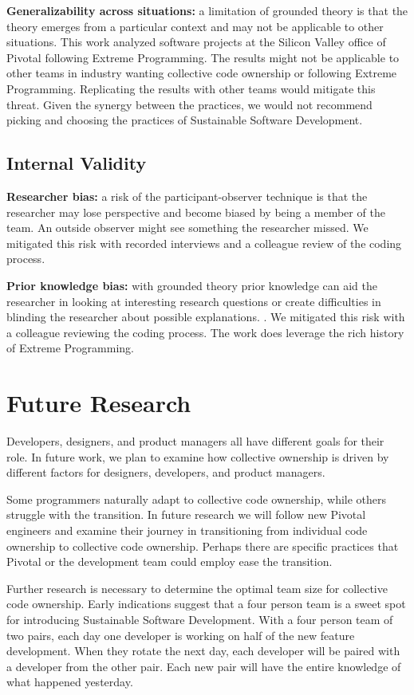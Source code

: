 \begin{table}[]
\textbf{Generalizability across situations:} a limitation of grounded theory is that the theory emerges from a particular context and may not be applicable to other situations. This work analyzed software projects at the Silicon Valley office of Pivotal following Extreme Programming. The results might not be applicable to other teams in industry wanting collective code ownership or  following Extreme Programming. Replicating the results with other teams would mitigate this threat. Given the synergy between the practices, we would not recommend picking and choosing the practices of Sustainable Software Development.

\subsection{Internal Validity}
\textbf{Researcher bias:} a risk of the participant-observer technique is that the researcher may lose perspective and become biased by being a member of the team. An outside observer might see something the researcher missed. We mitigated this risk with recorded interviews and a colleague review of the coding process. 

\textbf{Prior knowledge bias:} with grounded theory prior knowledge can aid the researcher in looking at interesting research questions or create difficulties in blinding the researcher about possible explanations. \cite{GlaserIssues}. We mitigated this risk with a colleague reviewing the coding process. The work does leverage the rich history of Extreme Programming.
\section{Future Research}
Developers, designers, and product managers all have different goals for their role. In future work,  we plan to examine how collective ownership is driven by different factors for designers, developers, and product managers.

Some programmers naturally adapt to collective code ownership, while others struggle with the transition. In future research we will follow new Pivotal engineers and examine their journey in transitioning from individual code ownership to collective code ownership. Perhaps there are 
specific practices that Pivotal or the development team could employ ease the transition. 

Further research is necessary to determine the optimal team size for collective code ownership. Early indications suggest that a four person team is a sweet spot for introducing Sustainable Software Development. With a four person team of two pairs, each day one developer is working on half of the new feature development. When they rotate the next day, each developer will be paired with a developer from the other pair. Each new pair will have the entire knowledge of what happened yesterday. 



\end{table}
